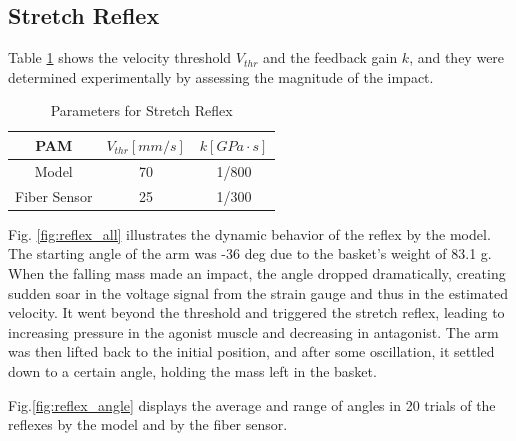 \begin{table}[H]
    \centering
    \caption{Parameters for Length Estimation} 
    \label{tab:PAM_reflex}
\end{table}


\subsection{Stretch Reflex}
Table \ref{tab:reflex_para} shows the velocity threshold $V_{thr}$ and the feedback gain $k$, and they were determined experimentally by assessing the magnitude of the impact. 

\begin{table}[h]
    \centering
    \caption{Parameters for Stretch Reflex} 
    \begin{tabular}{c|cc}
        \hline
        PAM &$V_{thr} [\si{mm/s}]$&$ k [\si{GPa\cdot s}]$\\
        \hline \hline
        Model & 70 & 1/800\\
        Fiber Sensor & 25 & 1/300\\
        \hline
    \end{tabular}
\label{tab:reflex_para}
\end{table}

Fig. \ref{fig:reflex_all} illustrates the dynamic behavior of the reflex by the model. The starting angle of the arm was -36 deg due to the basket's weight of 83.1 g. When the falling mass made an impact, the angle dropped dramatically, creating sudden soar in the voltage signal from the strain gauge and thus in the estimated velocity. It went beyond the threshold and triggered the stretch reflex, leading to increasing pressure in the agonist muscle and decreasing in antagonist. The arm was then lifted back to the initial position, and after some oscillation, it settled down to a certain angle, holding the mass left in the basket.

Fig.\ref{fig:reflex_angle} displays the average and range of angles in 20 trials of the reflexes by the model and by the fiber sensor.

